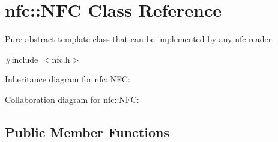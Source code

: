 \hypertarget{classnfc_1_1NFC}{}\section{nfc\+:\+:N\+FC Class Reference}
\label{classnfc_1_1NFC}


Pure abstract template class that can be implemented by any nfc reader.  




{\ttfamily \#include $<$nfc.\+h$>$}



Inheritance diagram for nfc\+:\+:N\+FC\+:


Collaboration diagram for nfc\+:\+:N\+FC\+:
\subsection*{Public Member Functions}
